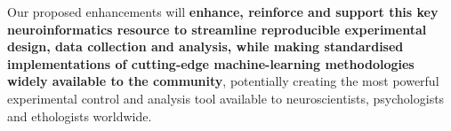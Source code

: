 Our proposed enhancements will \textbf{enhance, reinforce and support this key neuroinformatics
  resource to streamline reproducible experimental design, data collection and analysis, while making standardised implementations of cutting-edge machine-learning methodologies widely available to the community}, potentially creating the most powerful experimental
control and analysis tool available to neuroscientists, psychologists and
ethologists worldwide.




%
%





